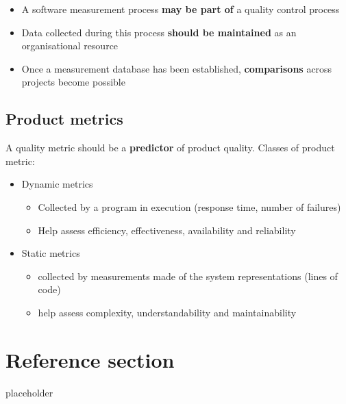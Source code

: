 \documentclass{article}
\begin{document}
\begin{itemize}
  \item A software measurement process \textbf{may be part of} a quality control process
  \item Data collected during this process \textbf{should be maintained} as an organisational resource
  \item Once a measurement database has been established, \textbf{comparisons} across projects become possible
\end{itemize}

\subsection{Product metrics}

\begin{flushleft}
A quality metric should be a \textbf{predictor} of product quality. Classes of product metric:
\begin{itemize}
  \item Dynamic metrics
  \begin{itemize}
    \item Collected by a program in execution (response time, number of failures)
    \item Help assess efficiency, effectiveness, availability and reliability
  \end{itemize}
  \item Static metrics
  \begin{itemize}
    \item collected by measurements made of the system representations (lines of code)
    \item help assess complexity, understandability and maintainability
  \end{itemize}
\end{itemize}
\end{flushleft}


\pagebreak
\section*{Reference section} \label{sec:reference}
\begin{description}
	\item[placeholder] \hfill \\
\end{description}
\end{document}
